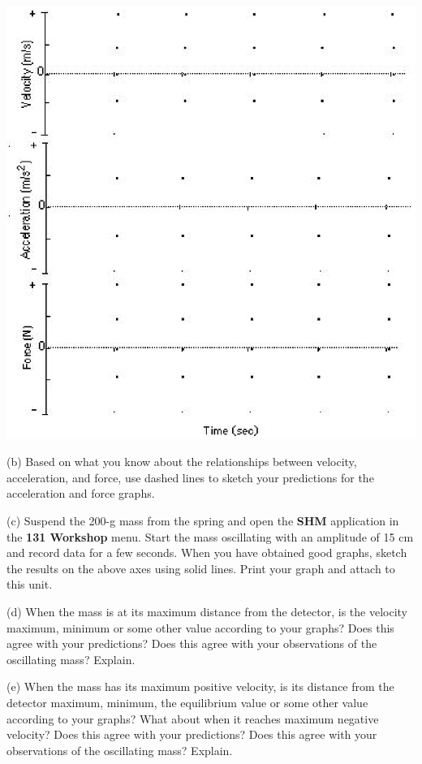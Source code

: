 \vspace{0.3cm}
{\par\centering \includegraphics{periodic_motion_fig3.eps} \par}
\vspace{0.3cm}

(b) Based on what you know about the relationships between velocity, acceleration,
and force, use dashed lines to sketch your predictions for the acceleration
and force graphs.

(c) Suspend the 200-g mass from the spring and open the \textbf{SHM} application in the \textbf{131 Workshop} menu. Start
the mass oscillating with an amplitude of 15 cm and record data for a few seconds. When you have obtained good graphs, sketch the results on the above axes using solid lines. Print your graph and attach to this unit.

(d) When the mass is at its maximum distance from the detector, is the velocity
maximum, minimum or some other value according to your graphs? Does this agree
with your predictions? Does this agree with your observations of the oscillating
mass? Explain.
\vspace{15mm}

(e) When the mass has its maximum positive velocity, is its distance from the
detector maximum, minimum, the equilibrium value or some other value according
to your graphs? What about when it reaches maximum negative velocity? Does this
agree with your predictions? Does this agree with your observations of the oscillating
mass? Explain. 
\vspace{20mm}

